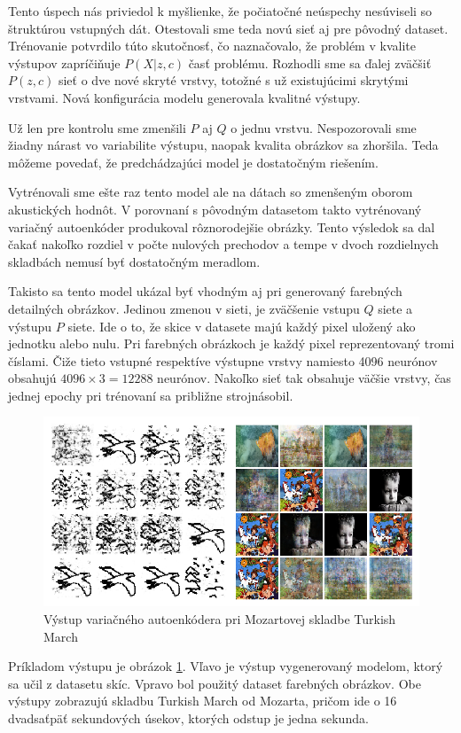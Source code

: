 Tento úspech nás priviedol k myšlienke, že počiatočné neúspechy nesúviseli so štruktúrou vstupných dát.
Otestovali sme teda novú sieť aj pre pôvodný dataset.
Trénovanie potvrdilo túto skutočnosť, čo naznačovalo, že problém v kvalite výstupov zapríčiňuje \(P(X|z,c)\) časť problému.
Rozhodli sme sa ďalej zväčšiť \(P(z, c)\) sieť o dve nové skryté vrstvy, totožné s už existujúcimi skrytými vrstvami.
Nová konfigurácia modelu generovala kvalitné výstupy.

Už len pre kontrolu sme zmenšili \(P\) aj \(Q\) o jednu vrstvu.
Nespozorovali sme žiadny nárast vo variabilite výstupu, naopak kvalita obrázkov sa zhoršila.
Teda môžeme povedať, že predchádzajúci model je dostatočným riešením.

Vytrénovali sme ešte raz tento model ale na dátach so zmenšeným oborom akustických hodnôt.
V porovnaní s pôvodným datasetom takto vytrénovaný variačný autoenkóder produkoval rôznorodejšie obrázky.
Tento výsledok sa dal čakať nakoľko rozdiel v počte nulových prechodov a tempe v dvoch rozdielnych skladbách nemusí byť dostatočným meradlom.

Takisto sa tento model ukázal byť vhodným aj pri generovaný farebných detailných obrázkov.
Jedinou zmenou v sieti, je zväčšenie vstupu \(Q\) siete a výstupu \(P\) siete.
Ide o to, že skice v datasete majú každý pixel uložený ako jednotku alebo nulu.
Pri farebných obrázkoch je každý pixel reprezentovaný tromi číslami.
Čiže tieto vstupné respektíve výstupne vrstvy namiesto 4096 neurónov obsahujú \(4096 \times 3 = 12288\) neurónov.
Nakoľko sieť tak obsahuje väčšie vrstvy, čas jednej epochy pri trénovaní sa približne strojnásobil.
\begin{figure}[!t] 
	\centering 
	\includegraphics[width=.8\textwidth]{figures/vae_mozart} 
	\caption{Výstup variačného autoenkódera pri Mozartovej skladbe Turkish March} 
	\label{vae_mozart}
\end{figure}
Príkladom výstupu je obrázok \ref{vae_mozart}.
Vľavo je výstup vygenerovaný modelom, ktorý sa učil z datasetu skíc.
Vpravo bol použitý dataset farebných obrázkov.
Obe výstupy zobrazujú skladbu Turkish March od Mozarta, pričom ide o 16 dvadsaťpäť sekundových úsekov, ktorých odstup je jedna sekunda.
